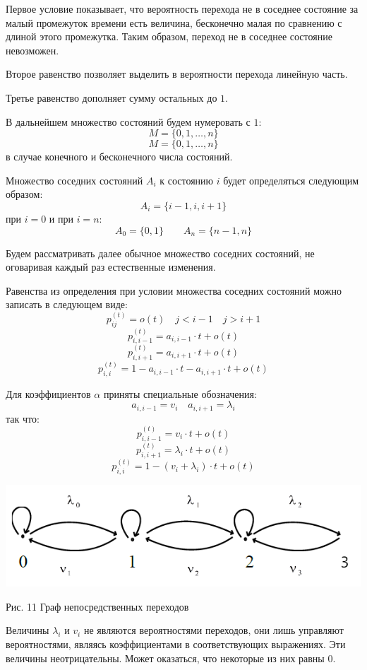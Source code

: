 \documentclass[aps,%
12pt,%
final,%
oneside,
onecolumn,%
musixtex, %
superscriptaddress,%
centertags]{article} %
\theoremstyle{plain}
\theoremstyle{definition}
\theoremstyle{remark}
\begin{document}
Первое условие показывает, что вероятность перехода не в соседнее состояние за малый промежуток времени есть величина, бесконечно малая по сравнению с длиной этого промежутка. Таким образом, переход не в соседнее состояние невозможен. 

Второе равенство позволяет выделить в вероятности перехода линейную часть.

Третье равенство дополняет сумму остальных до $1$.

В дальнейшем множество состояний будем нумеровать с $1$:
$$M = \{0,1,\ldots,n\}$$
$$M = \{0,1,\ldots,n\}$$
в случае конечного и бесконечного числа состояний.

Множество соседних состояний $A_i$ к состоянию $i$ будет определяться следующим образом:
$$A_i = \{i-1,i,i+1\}$$
при $i=0$ и при $i=n$:
$$A_0 = \{0,1\} \qquad A_n = \{n-1,n\}$$

Будем рассматривать далее обычное множество соседних состояний, не оговаривая каждый раз естественные изменения.

Равенства из определения при условии множества соседних состояний можно записать в следующем виде:
$$p_{ij}^{(t)} = o(t) \quad j<i-1 \quad j > i +1$$
$$p_{i,i-1}^{(t)} = a_{i,i-1} \cdot t + o(t)$$
$$p_{i,i+1}^{(t)} = a_{i,i+1} \cdot t + o(t)$$
$$p_{i,i}^{(t)} = 1 - a_{i,i-1} \cdot t - a_{i,i+1} \cdot t + o(t)$$

Для коэффициентов $\alpha$ приняты специальные обозначения:
$$a_{i,i-1} = v_i \quad  a_{i,i+1} = \lambda_i$$
так что:
$$p_{i,i-1}^{(t)} = v_i \cdot t + o(t)$$
$$p_{i,i+1}^{(t)} = \lambda_i \cdot t + o(t)$$
$$p_{i,i}^{(t)} = 1 - (v_i + \lambda_i) \cdot  t + o(t)$$

\begin{center}
  \includegraphics[scale=0.5]{images/11.png}

  Рис. 11 Граф непосредственных переходов
\end{center}

Величины $\lambda_i$ и $v_i$ не являются вероятностями переходов, они лишь управляют вероятностями, являясь коэффициентами в соответствующих выражениях. Эти величины неотрицательны. Может оказаться, что некоторые из них равны $0$.
\end{document}
